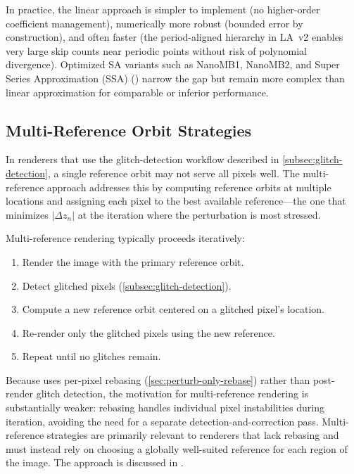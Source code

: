 In practice, the linear approach is simpler to implement (no
higher-order coefficient management), numerically more robust (bounded
error by construction), and often faster (the period-aligned hierarchy
in LA~v2 enables very large skip counts near periodic points without
risk of polynomial divergence).  Optimized SA variants such as NanoMB1,
NanoMB2, and Super Series Approximation (SSA)
(\cite{KallesFraktaler}) narrow the gap but remain more complex than
linear approximation for comparable or inferior performance.

\subsection{Multi-Reference Orbit Strategies}
\label{subsec:multi-reference}

In renderers that use the glitch-detection workflow described in
\cref{subsec:glitch-detection}, a single reference orbit may not serve
all pixels well.  The multi-reference approach addresses this by
computing reference orbits at multiple locations and assigning each pixel
to the best available reference---the one that minimizes $|\Delta z_n|$
at the iteration where the perturbation is most stressed.

Multi-reference rendering typically proceeds iteratively:
\begin{enumerate}
  \item Render the image with the primary reference orbit.
  \item Detect glitched pixels (\cref{subsec:glitch-detection}).
  \item Compute a new reference orbit centered on a glitched pixel's
        location.
  \item Re-render only the glitched pixels using the new reference.
  \item Repeat until no glitches remain.
\end{enumerate}

Because \FractalShark{} uses per-pixel rebasing
(\cref{sec:perturb-only-rebase}) rather than post-render glitch
detection, the motivation for multi-reference rendering is
substantially weaker: rebasing handles individual pixel instabilities
during iteration, avoiding the need for a separate detection-and-correction
pass.  Multi-reference strategies are primarily relevant to renderers
that lack rebasing and must instead rely on choosing a globally
well-suited reference for each region of the image.  The approach is
discussed in \cite{HeilandAllen2022DeepZoom}.

